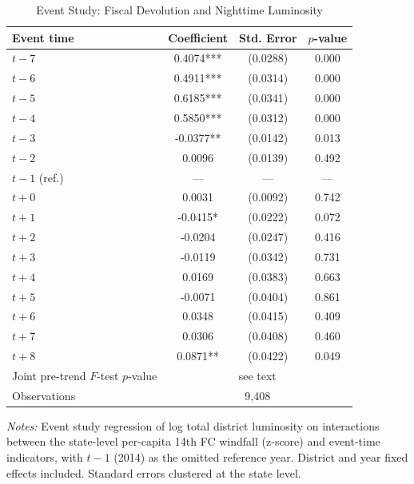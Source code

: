 \begin{table}[htbp]
\centering
\begin{threeparttable}
\caption{Event Study: Fiscal Devolution and Nighttime Luminosity}
\label{tab:event_study}
\begin{tabular}{lccc}
\toprule
Event time & Coefficient & Std. Error & $p$-value \\
\midrule
$t -7$ & 0.4074*** & (0.0288) & 0.000 \\
$t -6$ & 0.4911*** & (0.0314) & 0.000 \\
$t -5$ & 0.6185*** & (0.0341) & 0.000 \\
$t -4$ & 0.5850*** & (0.0312) & 0.000 \\
$t -3$ & -0.0377** & (0.0142) & 0.013 \\
$t -2$ & 0.0096 & (0.0139) & 0.492 \\
$t - 1$ (ref.) & --- & --- & --- \\
\midrule
$t + 0$ & 0.0031 & (0.0092) & 0.742 \\
$t + 1$ & -0.0415* & (0.0222) & 0.072 \\
$t + 2$ & -0.0204 & (0.0247) & 0.416 \\
$t + 3$ & -0.0119 & (0.0342) & 0.731 \\
$t + 4$ & 0.0169 & (0.0383) & 0.663 \\
$t + 5$ & -0.0071 & (0.0404) & 0.861 \\
$t + 6$ & 0.0348 & (0.0415) & 0.409 \\
$t + 7$ & 0.0306 & (0.0408) & 0.460 \\
$t + 8$ & 0.0871** & (0.0422) & 0.049 \\
\midrule
Joint pre-trend $F$-test $p$-value & \multicolumn{3}{c}{see text} \\
Observations & \multicolumn{3}{c}{9,408} \\
\bottomrule
\end{tabular}
\begin{tablenotes}[flushleft]\footnotesize
\item \textit{Notes:} Event study regression of log total district luminosity on interactions between the state-level per-capita 14th FC windfall (z-score) and event-time indicators, with $t - 1$ (2014) as the omitted reference year. District and year fixed effects included. Standard errors clustered at the state level.
\end{tablenotes}
\end{threeparttable}
\end{table}
